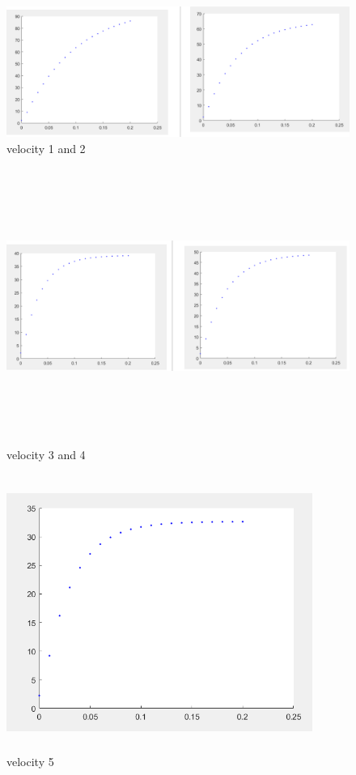 \documentclass[12pt]{report}
\begin{document}
\begin{figure}
    \centering
    \includegraphics[width=1\linewidth]{velocity12.png}
    \caption{velocity 1 and 2}
    \label{fig:my_label}
\end{figure} 
\begin{figure}[htbp]\centering\includegraphics[height=9cm,width=16cm]{velocity34.png}
\caption{velocity 3 and 4}
\end{figure}   
\begin{figure}[htbp]\centering\includegraphics[height=9cm,width=10cm]{velocity5.png}
\caption{velocity 5}
\end{figure}
\clearpage
\end{document}
